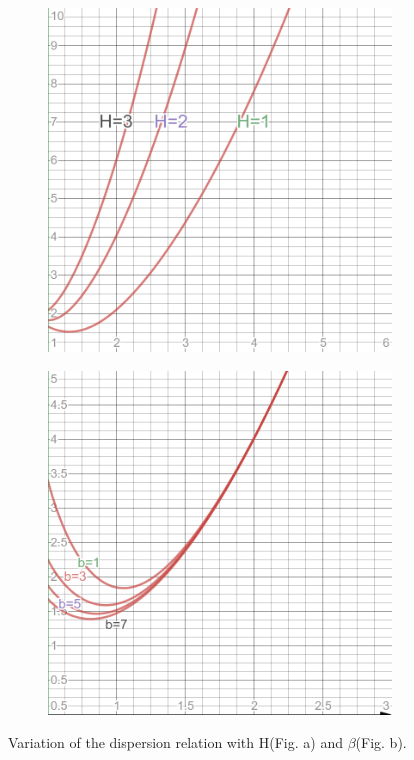 \documentclass[a4paper, 12pt]{article}
\begin{document}
\begin{figure}[t]
    \begin{subfigure}{0.5\textwidth}
    \centering
    \includegraphics[scale=0.2]{real-disp-Hvar.png}
    \end{subfigure}
    \begin{subfigure}{0.5\textwidth}
    \centering
    \includegraphics[scale=0.2]{real-disp-b_var.png}
    \end{subfigure}
    \caption{Variation of the dispersion relation with H(Fig. a) and $\beta$(Fig. b).}
    \label{disp-var1}
\end{figure}
\newpage
\end{document}
